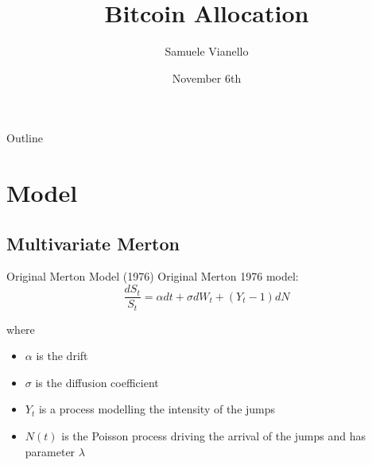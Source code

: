 \documentclass{beamer}
\title[Your Short Title]{Bitcoin Allocation}
\author{Samuele Vianello}
\date{November 6th}
\begin{document}
\begin{frame}
  \titlepage
\end{frame}

\begin{frame}{Outline}
  \tableofcontents
\end{frame}


%
%

%

\section{Model}

\subsection{Multivariate Merton}

\begin{frame}{Original Merton Model (1976)}
Original Merton 1976 \cite{MERTON1976} model:
\begin{equation}
\label{merton_model}
    \frac{dS_t}{S_t} = \alpha dt + \sigma dW_t  + (Y_t-1)dN
\end{equation}

where 
\begin{itemize}
    \item $\alpha$ is the drift
    \item $\sigma$ is the diffusion coefficient
    \item $Y_t$ is a process modelling the intensity of the jumps
    \item $N(t)$ is the Poisson process driving the arrival of the jumps and has parameter $\lambda$
\end{itemize}

\end{frame}
\end{document}
